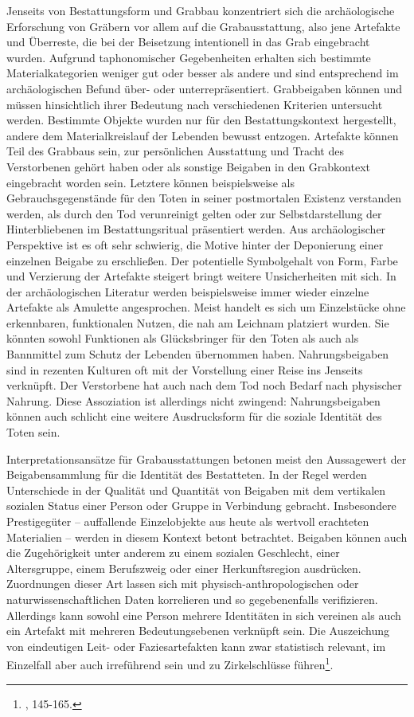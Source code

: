 \documentclass[openany,twoside,twocolumn]{book}
\let\rmarkdownfootnote\footnote%
\def\footnote{\protect\rmarkdownfootnote}
\begin{document}
Jenseits von Bestattungsform und Grabbau konzentriert sich die
archäologische Erforschung von Gräbern vor allem auf die
Grabausstattung, also jene Artefakte und Überreste, die bei der
Beisetzung intentionell in das Grab eingebracht wurden. Aufgrund
taphonomischer Gegebenheiten erhalten sich bestimmte Materialkategorien
weniger gut oder besser als andere und sind entsprechend im
archäologischen Befund über- oder unterrepräsentiert. Grabbeigaben
können und müssen hinsichtlich ihrer Bedeutung nach verschiedenen
Kriterien untersucht werden. Bestimmte Objekte wurden nur für den
Bestattungskontext hergestellt, andere dem Materialkreislauf der
Lebenden bewusst entzogen. Artefakte können Teil des Grabbaus sein, zur
persönlichen Ausstattung und Tracht des Verstorbenen gehört haben oder
als sonstige Beigaben in den Grabkontext eingebracht worden sein.
Letztere können beispielsweise als Gebrauchsgegenstände für den Toten in
seiner postmortalen Existenz verstanden werden, als durch den Tod
verunreinigt gelten oder zur Selbstdarstellung der Hinterbliebenen im
Bestattungsritual präsentiert werden. Aus archäologischer Perspektive
ist es oft sehr schwierig, die Motive hinter der Deponierung einer
einzelnen Beigabe zu erschließen. Der potentielle Symbolgehalt von Form,
Farbe und Verzierung der Artefakte steigert bringt weitere
Unsicherheiten mit sich. In der archäologischen Literatur werden
beispielsweise immer wieder einzelne Artefakte als Amulette
angesprochen. Meist handelt es sich um Einzelstücke ohne erkennbaren,
funktionalen Nutzen, die nah am Leichnam platziert wurden. Sie könnten
sowohl Funktionen als Glücksbringer für den Toten als auch als
Bannmittel zum Schutz der Lebenden übernommen haben. Nahrungsbeigaben
sind in rezenten Kulturen oft mit der Vorstellung einer Reise ins
Jenseits verknüpft. Der Verstorbene hat auch nach dem Tod noch Bedarf
nach physischer Nahrung. Diese Assoziation ist allerdings nicht
zwingend: Nahrungsbeigaben können auch schlicht eine weitere
Ausdrucksform für die soziale Identität des Toten sein.

Interpretationsansätze für Grabausstattungen betonen meist den
Aussagewert der Beigabensammlung für die Identität des Bestatteten. In
der Regel werden Unterschiede in der Qualität und Quantität von Beigaben
mit dem vertikalen sozialen Status einer Person oder Gruppe in
Verbindung gebracht. Insbesondere Prestigegüter -- auffallende
Einzelobjekte aus heute als wertvoll erachteten Materialien -- werden in
diesem Kontext betont betrachtet. Beigaben können auch die Zugehörigkeit
unter anderem zu einem sozialen Geschlecht, einer Altersgruppe, einem
Berufszweig oder einer Herkunftsregion ausdrücken. Zuordnungen dieser
Art lassen sich mit physisch-anthropologischen oder
naturwissenschaftlichen Daten korrelieren und so gegebenenfalls
verifizieren. Allerdings kann sowohl eine Person mehrere Identitäten in
sich vereinen als auch ein Artefakt mit mehreren Bedeutungsebenen
verknüpft sein. Die Auszeichung von eindeutigen Leit- oder
Faziesartefakten kann zwar statistisch relevant, im Einzelfall aber auch
irreführend sein und zu Zirkelschlüsse führen\footnote{\textcite{hofmann_rituelle_2008},
  145-165.}.
\end{document}
